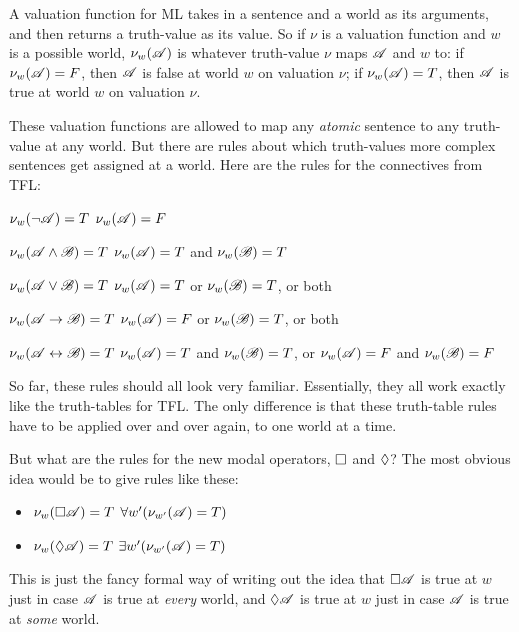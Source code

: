 A valuation function for ML takes in a sentence and a world as its arguments, and then returns a truth-value as its value. So if $\nu$ is a valuation function and $w$ is a possible world, $\nu_w(\mathscr{A})$ is whatever truth-value $\nu$ maps $\mathscr{A}$ and $w$ to: if $\nu_w(\mathscr{A})=F$, then $\mathscr{A}$ is false at world $w$ on valuation $\nu$; if $\nu_w(\mathscr{A})=T$, then $\mathscr{A}$ is true at world $w$ on valuation $\nu$.

These valuation functions are allowed to map any \emph{atomic} sentence to any truth-value at any world. But there are rules about which truth-values more complex sentences get assigned at a world. Here are the rules for the connectives from TFL:
\begin{compactlist}
	\item $\nu_w(\neg\mathscr{A})=T$ \ifeff{} $\nu_w(\mathscr{A})=F$
	\item $\nu_w(\mathscr{A}\wedge\mathscr{B})=T$ \ifeff{} $\nu_w(\mathscr{A})=T$ and $\nu_w(\mathscr{B})=T$
	\item $\nu_w(\mathscr{A}\vee\mathscr{B})=T$ \ifeff{} $\nu_w(\mathscr{A})=T$ or $\nu_w(\mathscr{B})=T$, or both
	\item $\nu_w(\mathscr{A}\rightarrow\mathscr{B})=T$ \ifeff{} $\nu_w(\mathscr{A})=F$ or $\nu_w(\mathscr{B})=T$, or both
	\item $\nu_w(\mathscr{A}\leftrightarrow\mathscr{B})=T$ \ifeff{} $\nu_w(\mathscr{A})=T$ and $\nu_w(\mathscr{B})=T$, or $\nu_w(\mathscr{A})=F$ and $\nu_w(\mathscr{B})=F$
\end{compactlist}
So far, these rules should all look very familiar. Essentially, they all work exactly like the truth-tables for TFL. The only difference is that these truth-table rules have to be applied over and over again, to one world at a time.

But what are the rules for the new modal operators, $\Box$ and $\Diamond$? The most obvious idea would be to give rules like these:
\begin{itemize}
	\item $\nu_w(\Box \mathscr{A})=T$ \ifeff{} $\forall w' (\nu_{w'}(\mathscr{A})=T)$
	\item $\nu_w(\Diamond \mathscr{A})=T$ \ifeff{} $\exists w' (\nu_{w'}(\mathscr{A})=T)$
\end{itemize}
This is just the fancy formal way of writing out the idea that $\Box\mathscr{A}$ is true at $w$ just in case $\mathscr{A}$ is true at \emph{every} world, and $\Diamond\mathscr{A}$ is true at $w$ just in case $\mathscr{A}$ is true at \emph{some} world.

